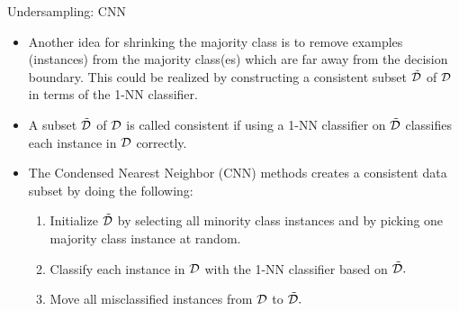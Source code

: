 \documentclass[11pt,compress,t,notes=noshow, xcolor=table]{beamer}
\begin{document}
	\begin{frame}{Undersampling: CNN}
	
	\footnotesize{
		\begin{itemize}
			\item Another idea for shrinking the majority class is to remove examples (instances) from the majority class(es) which are far away from the decision boundary. This could be realized by constructing a consistent subset $\tilde{\mathcal{D}}$ of $\mathcal{D}$ in terms of the 1-NN classifier. 
%			
			\item A subset $\tilde{\mathcal{D}}$ of $\mathcal{D}$ is called consistent if using a 1-NN classifier on $\tilde{\mathcal{D}}$ classifies each instance in $\mathcal{D}$ correctly.
%			
		\end{itemize}
		\begin{minipage}{0.55\textwidth}	
			\begin{itemize}
%				
				\item The Condensed Nearest Neighbor (CNN) methods creates a consistent data subset by doing the following:
%				
				\begin{enumerate} \footnotesize
					\item Initialize $\tilde{\mathcal{D}}$ by selecting all minority class instances and by picking one majority class instance at random.
					\item Classify each instance in $\mathcal{D}$ with the 1-NN classifier based on $\tilde{\mathcal{D}}.$
					\item Move all misclassified instances from $\mathcal{D}$ to $\tilde{\mathcal{D}}.$
					

\end{enumerate}
\end{itemize}
\end{minipage}}
\end{frame}
\end{document}
